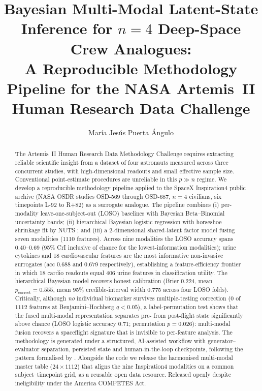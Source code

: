 \documentclass[11pt,a4paper,3p,authoryear]{elsarticle}
\begin{document}
\begin{frontmatter}

\title{Bayesian Multi-Modal Latent-State Inference for $n=4$ Deep-Space Crew Analogues:\\
A Reproducible Methodology Pipeline for the {NASA} Artemis~{II} Human Research Data Challenge}

\author[a]{Mar\'ia Jes\'us Puerta \'Angulo}
\address[a]{Independent researcher, Tarragona, Spain}

\begin{abstract}
The Artemis~II Human Research Data Methodology Challenge \citep{NASAhrp2026} requires extracting reliable scientific insight from a dataset of four astronauts measured across three concurrent studies, with high-dimensional readouts and small effective sample size. Conventional point-estimate procedures are unreliable in this $p \gg n$ regime. We develop a reproducible methodology pipeline applied to the SpaceX Inspiration4 public archive (NASA OSDR studies \mbox{OSD-569} through \mbox{OSD-687}, $n=4$ civilians, six timepoints \mbox{L-92} to \mbox{R+82}) as a surrogate analogue. The pipeline combines (i) per-modality leave-one-subject-out (LOSO) baselines with Bayesian Beta--Binomial uncertainty bands; (ii) hierarchical Bayesian logistic regression with horseshoe shrinkage \citep{Carvalho2010horseshoe} fit by NUTS \citep{Hoffman2014nuts}; and (iii) a 2-dimensional shared-latent factor model fusing seven modalities (1110 features). Across nine modalities the LOSO accuracy spans 0.40--0.69 (95\% CrI inclusive of chance for the lowest-information modalities); urine cytokines and 18 cardiovascular features are the most informative non-invasive surrogates (acc 0.688 and 0.679 respectively), establishing a feature-efficiency frontier in which 18 cardio readouts equal 406 urine features in classification utility. The hierarchical Bayesian model recovers honest calibration (Brier 0.224, mean $p_\mathrm{correct} = 0.555$, mean 95\% credible-interval width 0.775 across four LOSO folds). Critically, although \emph{no} individual biomarker survives multiple-testing correction ($0$ of $1112$ features at Benjamini--Hochberg $q<0.05$), a label-permutation test shows that the fused multi-modal representation separates pre- from post-flight state significantly above chance (LOSO logistic accuracy $0.71$; permutation $p = 0.026$): multi-modal fusion recovers a spaceflight signature that is invisible to per-feature analysis. The methodology is generated under a structured, AI-assisted workflow with generator--evaluator separation, persisted state and human-in-the-loop checkpoints, following the pattern formalised by \citet{Zhou2026nora}. Alongside the code we release the harmonised multi-modal master table ($24 \times 1112$) that aligns the nine Inspiration4 modalities on a common subject--timepoint grid, as a reusable open data resource. Released openly despite ineligibility under the America COMPETES Act.
\end{abstract}


\end{frontmatter}
\end{document}
